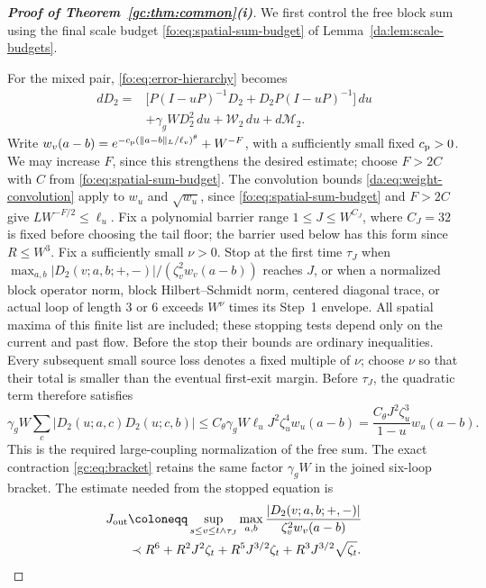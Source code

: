 \documentclass[11pt]{article}
\numberwithin{equation}{section}
\theoremstyle{remark}
\begin{document}
\begin{proof}[\textbf{Proof of Theorem~\ref{gc:thm:common}(i)}]
We first control the free block sum using the final scale budget
\eqref{fo:eq:spatial-sum-budget} of Lemma~\ref{da:lem:scale-budgets}.

For the mixed pair, \eqref{fo:eq:error-hierarchy} becomes
\begin{equation}\label{fo:eq:pair-error}
 \begin{split}
 dD_2={}&\bigl[P(I-uP)^{-1}D_2+D_2P(I-uP)^{-1}\bigr]\,du\\
       &+\gamma_g W D_2^2\,du+\mathcal W_2\,du+d\mathcal M_2.
 \end{split}
\end{equation}
Write $w_v(a-b)=e^{-c_{\rm p}(\|a-b\|_L/\ell_v)^\theta}+W^{-F}$,
with a sufficiently small fixed $c_{\rm p}>0$. We may increase $F$,
since this strengthens the desired estimate; choose $F>2C$ with $C$
from \eqref{fo:eq:spatial-sum-budget}. The convolution bounds \eqref{da:eq:weight-convolution} apply to
$w_u$ and $\sqrt{w_u}$, since \eqref{fo:eq:spatial-sum-budget} and
$F>2C$ give $LW^{-F/2}\le\ell_u$.
Fix a polynomial barrier range $1\le J\le W^{C_J}$, where $C_J=32$ is
fixed before choosing the tail floor; the barrier used below has this
form since $R\le W^3$. Fix a sufficiently small $\nu>0$.
Stop at the first time $\tau_J$ when
$\max_{a,b}|D_2(v;a,b;+,-)|/(\zeta_v^2w_v(a-b))$ reaches $J$,
or when a normalized block operator norm, block Hilbert--Schmidt norm,
centered diagonal trace, or actual loop of length $3$ or $6$ exceeds
$W^\nu$ times its Step~1 envelope. All spatial maxima of this finite
list are included; these stopping tests depend only on the current
and past flow. Before the stop their bounds are ordinary inequalities.
Every subsequent small source loss denotes a fixed multiple of $\nu$;
choose $\nu$ so that their total is smaller than the eventual first-exit
margin. Before $\tau_J$, the quadratic term
therefore satisfies
\[
 \gamma_gW\sum_c|D_2(u;a,c)D_2(u;c,b)|
 \le C_\theta\gamma_gW\ell_u J^2\zeta_u^4w_u(a-b)
 =\frac{C_\theta J^2\zeta_u^3}{1-u}w_u(a-b).
\]
This is the required large-coupling normalization of the free sum.
The exact contraction \eqref{gc:eq:bracket} retains the same factor
$\gamma_gW$ in the joined six-loop bracket.
The estimate needed from the stopped equation is
\begin{equation}\label{gc:eq:spatialstop}
 \begin{aligned}
 J_{\rm out}&\coloneqq
 \sup_{s\le v\le t\wedge\tau_J}\max_{a,b}
 \frac{|D_2(v;a,b;+,-)|}{\zeta_v^2w_v(a-b)}\\
 &\prec R^6+R^2J^2\zeta_t
       +R^5J^{3/2}\zeta_t+R^3J^{3/2}\sqrt{\zeta_t}.

\end{aligned}
\end{equation}
\end{proof}
\end{document}
